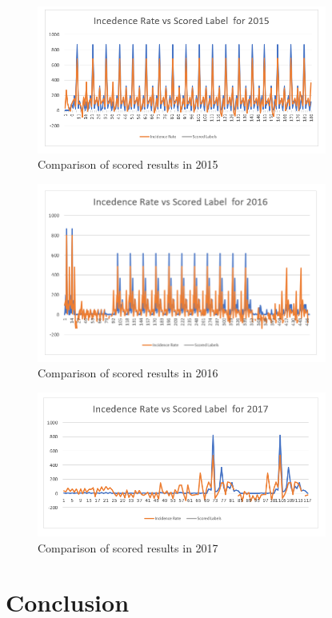 \documentclass[conference]{IEEEtran}
\begin{document}
\begin{figure}[ht!] %
 \centering
 \includegraphics[width=3.75in]{6.png}
 \caption{Comparison of scored results in 2015 }
 \label{compare_score_2015}
 \end{figure}

\begin{figure}[ht!] %
 \centering
 \includegraphics[width=3.75in]{7.png}
 \caption{Comparison of scored results in 2016}
 \label{compare_score_2016}
 \end{figure}

\begin{figure}[ht!] %
 \centering
 \includegraphics[width=3.75in]{8.png}
 \caption{Comparison of scored results in 2017}
 \label{compare_score_2017}
 \end{figure}


\thispagestyle{empty}
\section{Conclusion}
\end{document}
